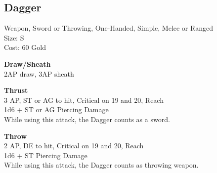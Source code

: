 \subsection{Dagger}\label{weapon:dagger}
Weapon, Sword or Throwing, One-Handed, Simple, Melee or Ranged\\
Size: S\\
Cost: 60 Gold

\textbf{Draw/Sheath}\\
2AP draw, 3AP sheath

\textbf{Thrust} \\
3 AP, ST or AG to hit, Critical on 19 and 20,  Reach\\
1d6 + \texttimes ST or AG Piercing Damage\\
While using this attack, the Dagger counts as a sword.

\textbf{Throw} \\
2 AP, DE to hit, Critical on 19 and 20,  Reach\\
1d6 + \texttimes ST Piercing Damage\\
While using this attack, the Dagger counts as throwing weapon.

